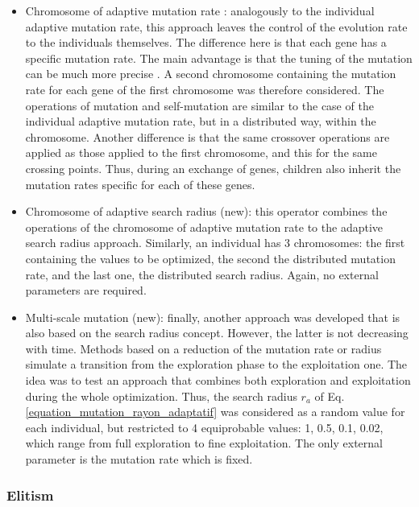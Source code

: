 \documentclass{ametsoc}
\begin{document}
\begin{itemize}
	\item Chromosome of adaptive mutation rate \citep[or \textit{n adaptative mutation rate},][]{Back1992a}: analogously to the individual adaptive mutation rate, this approach leaves the control of the evolution rate to the individuals themselves. The difference here is that each gene has a specific mutation rate. The main advantage is that the tuning of the mutation can be much more precise \citep{Smith1997a}. A second chromosome containing the mutation rate for each gene of the first chromosome was therefore considered. The operations of mutation and self-mutation are similar to the case of the individual adaptive mutation rate, but in a distributed way, within the chromosome. Another difference is that the same crossover operations are applied as those applied to the first chromosome, and this for the same crossing points. Thus, during an exchange of genes, children also inherit the mutation rates specific for each of these genes.
	
	\item Chromosome of adaptive search radius (new): this operator combines the operations of the chromosome of adaptive mutation rate to the adaptive search radius approach. Similarly, an individual has 3 chromosomes: the first containing the values to be optimized, the second the distributed mutation rate, and the last one, the distributed search radius. Again, no external parameters are required.
	
	\item Multi-scale mutation (new): finally, another approach was developed that is also based on the search radius concept. However, the latter is not decreasing with time. Methods based on a reduction of the mutation rate or radius simulate a transition from the exploration phase to the exploitation one. The idea was to test an approach that combines both exploration and exploitation during the whole optimization. Thus, the search radius $r_{a}$ of Eq. \ref{equation_mutation_rayon_adaptatif} was considered as a random value for each individual, but restricted to 4 equiprobable values: 1, 0.5, 0.1, 0.02, which range from full exploration to fine exploitation. The only external parameter is the mutation rate which is fixed.
	
\end{itemize}


\subsubsection{Elitism}
\end{document}
